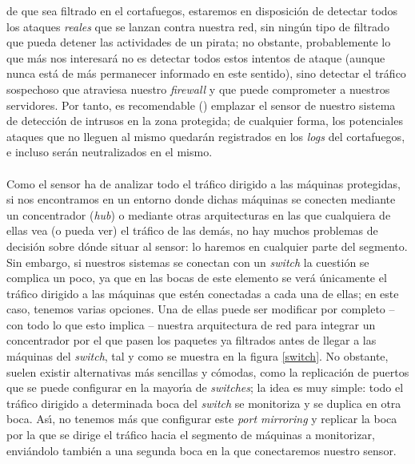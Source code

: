 de que sea filtrado en el cortafuegos, estaremos en disposici\'on de detectar
todos los ataques {\it reales} que se lanzan contra nuestra red, sin ning\'un
tipo de filtrado que pueda detener las actividades de un pirata; no obstante,
probablemente lo que m\'as nos interesar\'a no es detectar todos estos intentos
de ataque (aunque nunca est\'a de m\'as permanecer informado en este sentido),
sino detectar el tr\'afico sospechoso que atraviesa nuestro {\it firewall} y
que puede comprometer a nuestros servidores. Por tanto, es recomendable 
(\cite{kn:ids99}) emplazar el sensor de nuestro sistema de detecci\'on de 
intrusos en la zona protegida; de cualquier forma, los potenciales ataques que 
no lleguen al mismo quedar\'an registrados en los {\it logs} del cortafuegos, e
incluso ser\'an neutralizados en el mismo.\\
\\Como el sensor ha de analizar todo el tr\'afico dirigido a las m\'aquinas
protegidas, si nos encontramos en un entorno donde dichas m\'aquinas se conecten
mediante un concentrador ({\it hub}) o mediante otras arquitecturas en las que 
cualquiera de
ellas vea (o pueda ver) el tr\'afico de las dem\'as, no hay muchos problemas
de decisi\'on sobre d\'onde situar al sensor: lo haremos en cualquier parte del
segmento. Sin embargo, si nuestros sistemas se conectan con un {\it switch} la
cuesti\'on se complica un poco, ya que en las bocas de este elemento se ver\'a 
\'unicamente el tr\'afico dirigido a las m\'aquinas que est\'en conectadas a
cada una de ellas; en este caso, tenemos varias opciones. Una de ellas puede
ser modificar por completo -- con todo lo que esto implica -- nuestra 
arquitectura de red para integrar un concentrador por el que pasen los paquetes
ya filtrados antes de llegar a las m\'aquinas del {\it switch}, tal y como
se muestra en la figura \ref{switch}. No obstante, suelen existir alternativas
m\'as sencillas y c\'omodas, como la replicaci\'on de puertos que se puede 
configurar en la mayor\'{\i}a de {\it switches}; la idea es muy simple: todo
el tr\'afico dirigido a determinada boca del {\it switch} se monitoriza y se
duplica en otra boca. As\'{\i}, no tenemos m\'as que configurar este {\it
port mirroring} y replicar la boca por la que se dirige el tr\'afico hacia el
segmento de m\'aquinas a monitorizar, envi\'andolo tambi\'en a una segunda boca
en la que conectaremos nuestro sensor.\\
